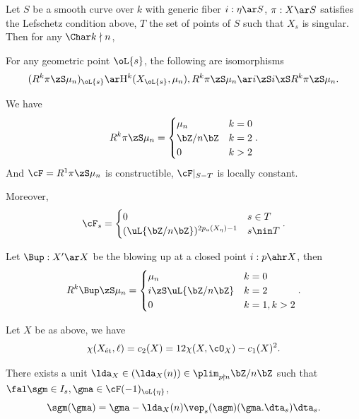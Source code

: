 \documentclass[a4paper, twoside]{article}
\begin{document}
\begin{thm}
  Let $S$ be a smooth curve over $k$ with generic fiber $i:\eta\ar S$, $\pi:X\ar S$ satisfies the Lefschetz condition above, $T$ the set of points of $S$ such that $X_{s}$ is singular. Then for any $\Char k\nmid n$,
  \begin{enr}
    \item For any geometric point $\oL{s}$, the following are isomorphisms
    \[
      (R^{k}\pi\zS \mu_{n})_{\oL{s}}\ar \mathrm{H}_{}^{k}(X_{\oL{s}},\mu_{n}), R^{k}\pi\zS\mu_{n}\ar i\zS i\xS R^{k}\pi\zS\mu_{n}.
    \]
    \item We have
    \[
      R^{k}\pi\zS \mu_{n}=\begin{cases}
        \mu_{n} & k=0 \\
        \bZ/n\bZ  & k=2 \\
        0    & k>2
      \end{cases}.
    \]
    And $\cF=R^{1}\pi\zS \mu_{n}$ is constructible, $\cF|_{S-T}$ is locally constant.
  \end{enr}
  Moreover,
  \[
    \cF_{s}=\begin{cases}
      0 & s\in T \\
      (\uL{\bZ/n\bZ})^{2p_{a}(X_{\eta})-1} & s\nin T
    \end{cases}.
  \]
\end{thm}

\begin{thm}
  Let $\Bup:X'\ar X$ be the blowing up at a closed point $i:p\ahr X$, then
  \[
    R^{k}\Bup\zS \mu_{n}=\begin{cases}
      \mu_{n} & k=0 \\
      i\zS\uL{\bZ/n\bZ} & k=2 \\
      0 & k=1, k>2
    \end{cases}.
  \]
\end{thm}

\begin{thm}
  Let $X$ be as above, we have
  \[
    \chi(X_{\text{{\'e}t}},\ell)=c_{2}(X)=12\chi(X,\cO_{X})-c_{1}(X)^{2}.
  \]
\end{thm}

\begin{thm}
  There exists a unit $\lda_{X}\in (\lda_{X}(n))\in\plim_{p\nmid n}\bZ/n\bZ$ such that $\fal \sgm\in I_{s}, \gma\in\cF(-1)_{\oL{\eta}}$,
  \[
    \sgm(\gma)=\gma-\lda_{X}(n)\vep_{s}(\sgm)(\gma.\dta_{s})\dta_{s}.
  \]
\end{thm}
\end{document}

